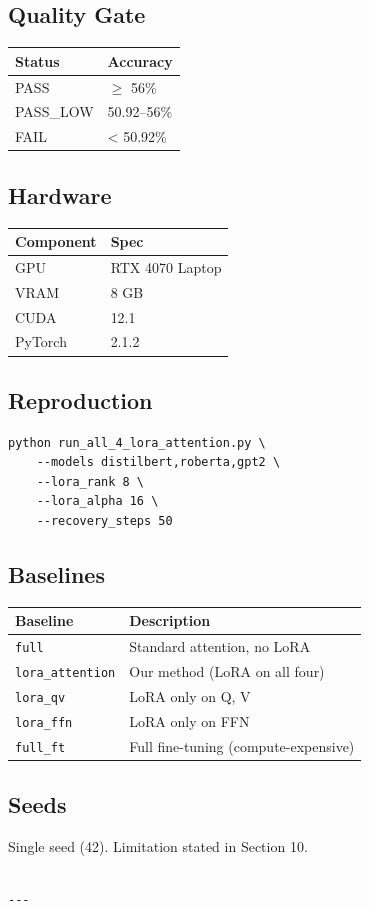 \subsection{Quality Gate}

\begin{table}[H]
\centering
\small
\begin{tabular}{ll}
\toprule
\textbf{Status} & \textbf{Accuracy} \\
\midrule
PASS & $\ge$ 56\% \\
PASS\_LOW & 50.92--56\% \\
FAIL & < 50.92\% \\
\bottomrule
\end{tabular}
\end{table}

\subsection{Hardware}

\begin{table}[H]
\centering
\small
\begin{tabular}{ll}
\toprule
\textbf{Component} & \textbf{Spec} \\
\midrule
GPU & RTX 4070 Laptop \\
VRAM & 8 GB \\
CUDA & 12.1 \\
PyTorch & 2.1.2 \\
\bottomrule
\end{tabular}
\end{table}

\subsection{Reproduction}

\begin{lstlisting}
python run_all_4_lora_attention.py \
    --models distilbert,roberta,gpt2 \
    --lora_rank 8 \
    --lora_alpha 16 \
    --recovery_steps 50
\end{lstlisting}

\subsection{Baselines}

\begin{table}[H]
\centering
\small
\begin{tabular}{ll}
\toprule
\textbf{Baseline} & \textbf{Description} \\
\midrule
\texttt{full} & Standard attention, no LoRA \\
\texttt{lora\_attention} & Our method (LoRA on all four) \\
\texttt{lora\_qv} & LoRA only on Q, V \\
\texttt{lora\_ffn} & LoRA only on FFN \\
\texttt{full\_ft} & Full fine-tuning (compute-expensive) \\
\bottomrule
\end{tabular}
\end{table}

\subsection{Seeds}

Single seed (42). Limitation stated in Section 10.
\begin{lstlisting}

---
\end{lstlisting}